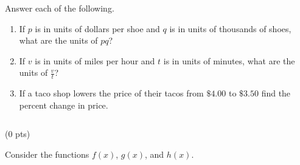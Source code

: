 \documentclass{ximera}
\begin{document}
Answer each of the following.

\begin{enumerate}[label=(\alph*)]
    \item If $p$ is in units of dollars per shoe and $q$ is in units of thousands of shoes, what are the units of $pq$? \vspace{5cm}
    \item If $v$ is in units of miles per hour and $t$ is in units of minutes, what are the units of $\frac{v}{t}$? \vspace{5cm}
    \item If a taco shop lowers the price of their tacos from $\$4.00$ to $\$3.50$ find the percent change in price. 
\end{enumerate}



\newpage $\,$
\newpage


 (0 pts)

Consider the functions $f(x)$, $g(x)$, and $h(x)$.
\end{document}
